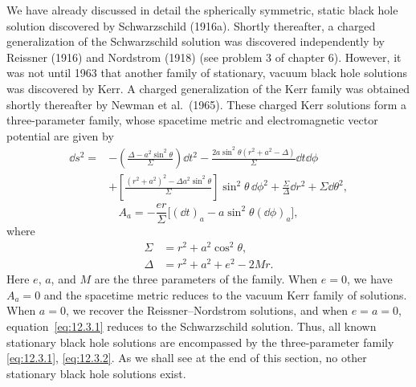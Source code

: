 We have already discussed in detail the spherically symmetric, static black hole
solution discovered by Schwarzschild (1916a). Shortly thereafter, a charged
generalization of the Schwarzschild solution was discovered independently by
Reissner (1916) and Nordstrom (1918) (see problem 3 of chapter 6). However, it was
not until 1963 that another family of stationary, vacuum black hole solutions was
discovered by Kerr. A charged generalization of the Kerr family was obtained shortly
thereafter by Newman et al.\ (1965). These charged Kerr solutions form a
three-parameter family, whose spacetime metric and electromagnetic vector potential
are given by
\begin{equation}
\begin{aligned}
 \dd s^2={}&-\left(\frac{\Delta-a^2\sin^2\theta}{\Sigma}\right)\dd t^2
 -\frac{2a\sin^2\theta(r^2+a^2-\Delta)}{\Sigma}\dd t\dd\phi\\
 &+\left[\frac{(r^2+a^2)^2-\Delta a^2\sin^2\theta}{\Sigma}\right]
 \sin^2\theta\,\dd\phi^2+\frac{\Sigma}{\Delta}\dd r^2+\Sigma\dd\theta^2 ,
\end{aligned}
\tag{12.3.1}\label{eq:12.3.1}
\end{equation}
\begin{equation}
 A_a=-\frac{er}{\Sigma}\bigl[(\dd t)_a-a\sin^2\theta(\dd\phi)_a\bigr],
 \tag{12.3.2}\label{eq:12.3.2}
\end{equation}
where
\begin{align}
 \Sigma&=r^2+a^2\cos^2\theta, \tag{12.3.3}\label{eq:12.3.3}\\
 \Delta&=r^2+a^2+e^2-2Mr. \tag{12.3.4}\label{eq:12.3.4}
\end{align}
Here \(e\), \(a\), and \(M\) are the three parameters of the family. When \(e=0\),
we have \(A_a=0\) and the spacetime metric reduces to the vacuum Kerr family of
solutions. When \(a=0\), we recover the Reissner--Nordstrom solutions, and when
\(e=a=0\), equation~\eqref{eq:12.3.1} reduces to the Schwarzschild solution. Thus,
all known stationary black hole solutions are encompassed by the three-parameter
family \eqref{eq:12.3.1}, \eqref{eq:12.3.2}. As we shall see at the end of this
section, no other stationary black hole solutions exist.

